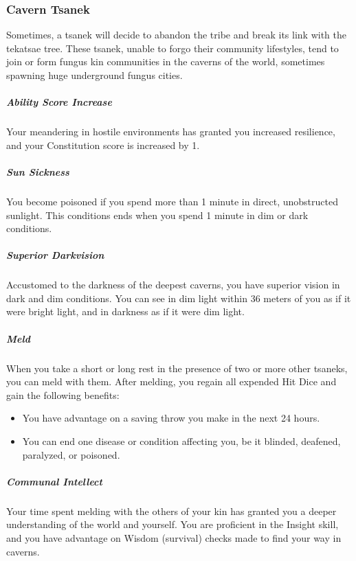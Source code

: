 \begin{linenumbers}
\subsubsection{Cavern Tsanek}
Sometimes, a tsanek will decide to abandon the tribe and break its link with the tekatsae tree.
These tsanek, unable to forgo their community lifestyles, tend to join or form fungus kin communities in the caverns of the world, sometimes spawning huge underground fungus cities.
\subparagraph{Ability Score Increase} Your meandering in hostile environments has granted you increased resilience, and your Constitution score is increased by 1.
\subparagraph{Sun Sickness} You become poisoned if you spend more than 1 minute in direct, unobstructed sunlight.
This conditions ends when you spend 1 minute in dim or dark conditions.
\subparagraph{Superior Darkvision} Accustomed to the darkness of the deepest caverns, you have superior vision in dark and dim conditions.
You can see in dim light within 36 meters of you as if it were bright light, and in darkness as if it were dim light.
\subparagraph{Meld} When you take a short or long rest in the presence of two or more other tsaneks, you can meld with them.
After melding, you regain all expended Hit Dice and gain the following benefits:
\begin{itemize}
    \item You have advantage on a saving throw you make in the next 24 hours.
    \item You can end one disease or condition affecting you, be it blinded, deafened, paralyzed, or poisoned.
\end{itemize}
\subparagraph{Communal Intellect} Your time spent melding with the others of your kin has granted you a deeper understanding of the world and yourself.
You are proficient in the Insight skill, and you have advantage on Wisdom (survival) checks made to find your way in caverns.
\end{linenumbers}
